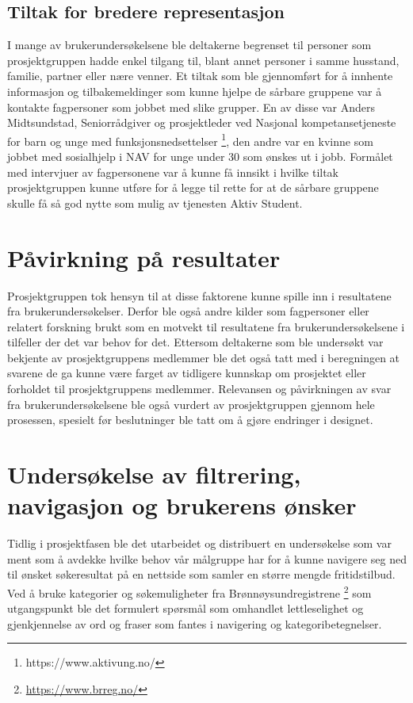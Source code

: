 \subsection{Tiltak for bredere representasjon}
I mange av brukerundersøkelsene ble deltakerne begrenset til personer som prosjektgruppen hadde enkel tilgang til, blant annet personer i samme husstand, familie, partner eller nære venner. Et tiltak som ble gjennomført for å innhente informasjon og tilbakemeldinger som kunne hjelpe de sårbare gruppene var å kontakte fagpersoner som jobbet med slike grupper. En av disse var Anders Midtsundstad, Seniorrådgiver og prosjektleder ved Nasjonal kompetansetjeneste for barn og unge med funksjonsnedsettelser \footnote{https://www.aktivung.no/}, den andre var en kvinne som jobbet med sosialhjelp i NAV for unge under 30 som ønskes ut i jobb. Formålet med intervjuer av fagpersonene var å kunne få innsikt i hvilke tiltak prosjektgruppen kunne utføre for å legge til rette for at de sårbare gruppene skulle få så god nytte som mulig av tjenesten Aktiv Student.

\section{Påvirkning på resultater}
Prosjektgruppen tok hensyn til at disse faktorene kunne spille inn i resultatene fra brukerundersøkelser. Derfor ble også andre kilder som fagpersoner eller relatert forskning brukt som en motvekt til resultatene fra brukerundersøkelsene i tilfeller der det var behov for det. Ettersom deltakerne som ble undersøkt var bekjente av prosjektgruppens medlemmer ble det også tatt med i beregningen at svarene de ga kunne være farget av tidligere kunnskap om prosjektet eller forholdet til prosjektgruppens medlemmer. Relevansen og påvirkningen av svar fra brukerundersøkelsene ble også vurdert av prosjektgruppen gjennom hele prosessen, spesielt før beslutninger ble tatt om å gjøre endringer i designet. 

\section{Undersøkelse av filtrering, navigasjon og brukerens ønsker}
\label{section:google-forms-test}
Tidlig i prosjektfasen ble det utarbeidet og distribuert en undersøkelse som var ment som å avdekke hvilke behov vår målgruppe har for å kunne navigere seg ned til ønsket søkeresultat på en nettside som samler en større mengde fritidstilbud. Ved å bruke kategorier og søkemuligheter fra Brønnøysundregistrene \footnote{\url{https://www.brreg.no/}} som utgangspunkt ble det formulert spørsmål som omhandlet lettleselighet og gjenkjennelse av ord og fraser som fantes i navigering og kategoribetegnelser.


